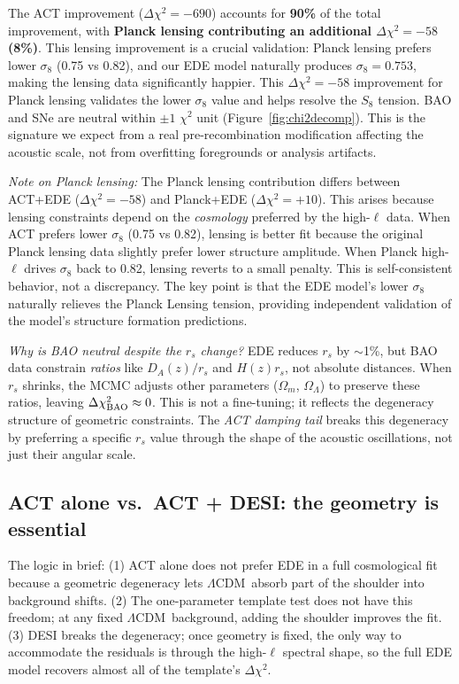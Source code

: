 \documentclass[twocolumn,showpacs,preprintnumbers,amsmath,amssymb,prd]{revtex4-2}
\newcommand{\lcdm}{$\Lambda$CDM}
\begin{document}
The ACT improvement ($\Delta\chi^2 = -690$) accounts for \textbf{90\%} of the 
total improvement, with \textbf{Planck lensing contributing an additional 
$\Delta\chi^2 = -58$ (8\%)}. This lensing improvement is a crucial validation: 
Planck lensing prefers lower $\sigma_8$ (0.75 vs 0.82), and our EDE model 
naturally produces $\sigma_8 = 0.753$, making the lensing data significantly 
happier. This $\Delta\chi^2 = -58$ improvement for Planck lensing validates 
the lower $\sigma_8$ value and helps resolve the $S_8$ tension. BAO and SNe 
are neutral within $\pm 1$ $\chi^2$ unit (Figure~\ref{fig:chi2decomp}). 
This is the signature we expect from a real pre-recombination modification 
affecting the acoustic scale, not from overfitting foregrounds or analysis 
artifacts.

\emph{Note on Planck lensing:} The Planck lensing contribution differs between 
ACT+EDE ($\Delta\chi^2 = -58$) and Planck+EDE ($\Delta\chi^2 = +10$). This arises 
because lensing constraints depend on the \emph{cosmology} preferred by the 
high-$\ell$ data. When ACT prefers lower $\sigma_8$ (0.75 vs 0.82), lensing is 
better fit because the original Planck lensing data slightly prefer lower 
structure amplitude. When Planck high-$\ell$ drives $\sigma_8$ back to 0.82, 
lensing reverts to a small penalty. This is self-consistent behavior, not 
a discrepancy. The key point is that the EDE model's lower $\sigma_8$ naturally 
relieves the Planck Lensing tension, providing independent validation of the 
model's structure formation predictions.

\emph{Why is BAO neutral despite the $r_s$ change?} EDE reduces $r_s$ by 
$\sim$1\%, but BAO data constrain \emph{ratios} like $D_A(z)/r_s$ and 
$H(z) r_s$, not absolute distances. When $r_s$ shrinks, the MCMC adjusts 
other parameters ($\Omega_m$, $\Omega_\Lambda$) to preserve these ratios, 
leaving $\Delta\chi^2_{\rm BAO} \approx 0$. This is not a fine-tuning; it 
reflects the degeneracy structure of geometric constraints. The \emph{ACT 
damping tail} breaks this degeneracy by preferring a specific $r_s$ value 
through the shape of the acoustic oscillations, not just their angular scale.

\subsection{ACT alone vs.\ ACT + DESI: the geometry is essential}
\label{sec:act_vs_desi}

The logic in brief: (1) ACT alone does not prefer EDE in a full cosmological 
fit because a geometric degeneracy lets \lcdm\ absorb part of the shoulder 
into background shifts. (2) The one-parameter template test does not have 
this freedom; at any fixed \lcdm\ background, adding the shoulder improves 
the fit. (3) DESI breaks the degeneracy; once geometry is fixed, the only 
way to accommodate the residuals is through the high-$\ell$ spectral shape, 
so the full EDE model recovers almost all of the template's $\Delta\chi^2$.
\end{document}
